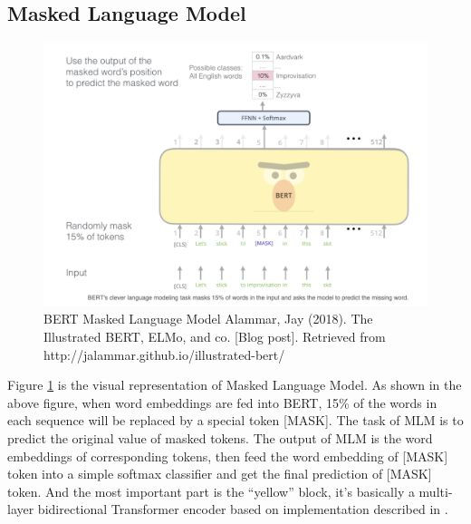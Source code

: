 \documentclass[]{krantz}
\begin{document}
\hypertarget{masked-language-model}{%
\subsection{Masked Language Model}\label{masked-language-model}}

\begin{figure}

{\centering \includegraphics[width=0.7\linewidth]{figures/02-03-transfer-learning-for-nlp/bert_masked_task} 

}

\caption{BERT Masked Language Model  
 Alammar, Jay (2018). The Illustrated BERT, ELMo, and co. [Blog post]. Retrieved from http://jalammar.github.io/illustrated-bert/}\label{fig:ch02-03-figure03}
\end{figure}

Figure \ref{fig:ch02-03-figure03} is the visual representation of Masked Language Model.
As shown in the above figure, when word embeddings are fed into BERT, 15\% of the words in each sequence will be replaced by a special token {[}MASK{]}. The task of MLM is to predict the original value of masked tokens. The output of MLM is the word embeddings of corresponding tokens, then feed the word embedding of {[}MASK{]} token into a simple softmax classifier and get the final prediction of {[}MASK{]} token. And the most important part is the ``yellow'' block, it's basically a multi-layer bidirectional Transformer encoder based on implementation described in \citet{kaiser2017one}.
\end{document}
